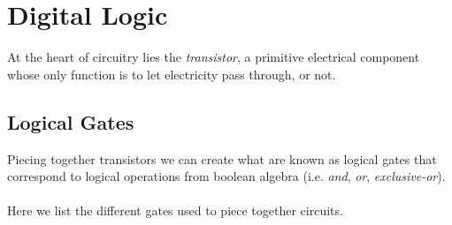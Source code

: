 %
%

\section{Digital Logic}
At the heart of circuitry lies the {\it transistor}, a primitive electrical
component whose only function is to let electricity pass through, or not.

\subsection{Logical Gates}
Piecing together transistors we can create what are known as logical gates
that correspond to logical operations from boolean algebra (i.e. {\it and},
{\it or}, {\it exclusive-or}).
\\\\
Here we list the different gates used to piece together circuits.

